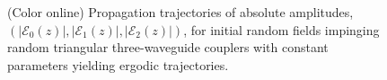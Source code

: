 \documentclass[9pt,twocolumn,twoside]{osajnl}
\begin{document}
\begin{figure}[htbp]
	\centering
	\caption{(Color online) Propagation trajectories of absolute amplitudes, $(\vert \mathcal{E}_{0}(z) \vert, \vert \mathcal{E}_{1}(z) \vert, \vert \mathcal{E}_{2}(z) \vert )$, for initial random fields impinging random triangular three-waveguide couplers with constant parameters yielding ergodic trajectories.}
	\label{fig:Fig6}
\end{figure}
\end{document}
